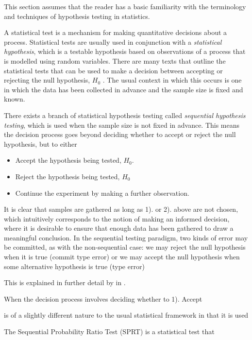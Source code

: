 
This section assumes that the reader has a basic familiarity with the terminology and techniques of hypothesis testing in statistics. 

A statistical test is a mechanism for making quantitative decisions about a process. Statistical tests are usually used in conjunction with a \textit{statistical hypothesis}, which is a testable hypothesis based on observations of a process that is modelled using random variables. There are many texts that outline the statistical tests that can be used to make a decision between accepting or rejecting the null hypothesis, $H_0$ . The usual context in which this occurs is one in which the data has been collected in advance and the sample size is fixed and known. \par

There exists a branch of statistical hypothesis testing called \textit{sequential hypothesis testing}, which is used when the sample size is not fixed in advance. This means the decision process goes beyond deciding whether to accept or reject the null hypothesis, but to either
\begin{itemize}
    \item Accept the hypothesis being tested, $H_0$.
    \item Reject the hypothesis being tested, $H_0$
    \item Continue the experiment by making a further observation.
\end{itemize}

It is clear that samples are gathered as long as 1). or 2). above are not chosen, which intuitively corresponds to the notion of making an informed decision, where it is desirable to ensure that enough data has been gathered to draw a meaningful conclusion. In the sequential testing paradigm, two kinds of error may be committed, as with the non-sequential case: we may reject the null hypothesis when it is true (commit type  error) or we may accept the null hypothesis when some alternative hypothesis is true (type  error)

This is explained in further detail by \citeauthor{Wald1945SequentialHypotheses} in \cite{Wald1945SequentialHypotheses}. 


When the decision process involves deciding whether to 1). Accept 

is of a slightly different nature to the usual statistical framework in that it is used 

The Sequential Probability Ratio Test (SPRT) is a statistical test that 